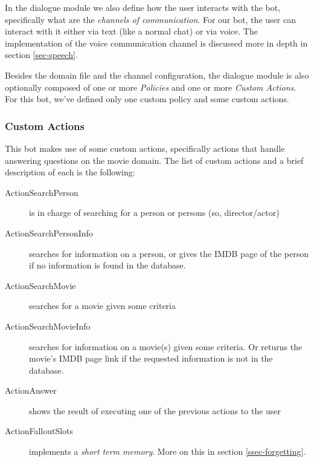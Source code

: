 \documentclass[11pt,a4paper]{article}
\begin{document}
			In the dialogue module we also define how the user interacts with the bot, specifically what are the \textit{channels of communication}. For our bot, the user can interact with it either via text (like a normal chat) or via voice. The implementation of the voice communication channel is discussed more in depth in section \ref{sec-speech}.
			
			Besides the domain file and the channel configuration, the dialogue module is also optionally composed of one or more \textit{Policies} and one or more \textit{Custom Actions}. For this bot, we've defined only one custom policy and some custom actions. 
			

		\subsubsection{Custom Actions}
		\label{ssec-custom-actions}	
			
			This bot makes use of some custom actions, specifically actions that handle answering questions on the movie domain. The list of custom actions and a brief description of each is the following:
			
			\begin{description}
				\item[ActionSearchPerson] 
				is in charge of searching for a person or persons (so, director/actor)
				
				\item[ActionSearchPersonInfo] 
				searches for information on a person, or gives the IMDB page of the person if no information is found in the database.
				
				\item[ActionSearchMovie] 
				searches for a movie given some criteria
				
				\item[ActionSearchMovieInfo] 
				searches for information on a movie(s) given some criteria. Or returns the movie's IMDB page link if the requested information is not in the database.
				
				\item[ActionAnswer] 
				shows the result of executing one of the previous actions to the user
				
				\item[ActionFalloutSlots] 
				implements a \textit{short term memory}. More on this in section \ref{ssec-forgetting}.
				
				
			\end{description}
			
\end{document}
